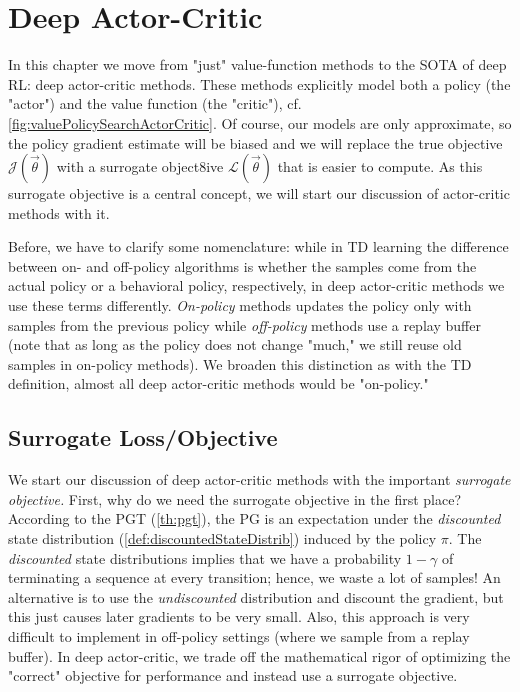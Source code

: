 \chapter{Deep Actor-Critic}
	\label{c:deepAC}

	In this chapter we move from "just" value-function methods to the \ac{SOTA} of deep \ac{RL}: deep actor-critic methods. These methods explicitly model both a policy (the "actor") and the value function (the "critic"), cf. \autoref{fig:valuePolicySearchActorCritic}. Of course, our models are only approximate, so the policy gradient estimate will be biased and we will replace the true objective \(\mathcal{J}(\vec{\theta})\) with a surrogate object8ive \(\mathcal{L}(\vec{\theta})\) that is easier to compute. As this surrogate objective is a central concept, we will start our discussion of actor-critic methods with it.

	Before, we have to clarify some nomenclature: while in \ac{TD} learning the difference between on- and off-policy algorithms is whether the samples come from the actual policy or a behavioral policy, respectively, in deep actor-critic methods we use these terms differently. \emph{On-policy} methods updates the policy only with samples from the previous policy while \emph{off-policy} methods use a replay buffer (note that as long as the policy does not change "much," we still reuse old samples in on-policy methods). We broaden this distinction as with the \ac{TD} definition, almost all deep actor-critic methods would be "on-policy."

	\section{Surrogate Loss/Objective}
		We start our discussion of deep actor-critic methods with the important \emph{surrogate objective.} First, why do we need the surrogate objective in the first place? According to the \ac{PGT} (\autoref{th:pgt}), the \ac{PG} is an expectation under the \emph{discounted} state distribution (\autoref{def:discountedStateDistrib}) induced by the policy \(\pi\). The \emph{discounted} state distributions implies that we have a probability \(1 - \gamma\) of terminating a sequence at every transition; hence, we waste a lot of samples! An alternative is to use the \emph{undiscounted} distribution and discount the gradient, but this just causes later gradients to be very small. Also, this approach is very difficult to implement in off-policy settings (where we sample from a replay buffer). In deep actor-critic, we trade off the mathematical rigor of optimizing the "correct" objective for performance and instead use a surrogate objective.

